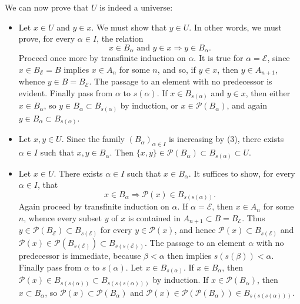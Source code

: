 \documentclass[11pt]{article}
\newcommand{\Pset}{\mathcal{P}}
\begin{document}
We can now prove that \(U\) is indeed a universe:
\begin{itemize}[leftmargin=4em]
\item[(U.I)] Let \(x\in U\) and \(y\in x\). We must show that \(y\in U\). In other words, we must prove, for every \(\alpha\in I\), the relation
\[
 x\in B_\alpha\text{ and }y\in x\Longrightarrow y\in B_\alpha.
\]
Proceed once more by transfinite induction on \(\alpha\). It is true for \(\alpha=\mathcal E\), since \(x\in B_{\mathcal E}=B\) implies \(x\in A_n\) for some \(n\), and so, if \(y\in x\), then \(y\in A_{n+1}\), whence \(y\in B=B_{\mathcal E}\). The passage to an element with no predecessor is evident. Finally pass from \(\alpha\) to \(s(\alpha)\). If \(x\in B_{s(\alpha)}\) and \(y\in x\), then either \(x\in B_\alpha\), so \(y\in B_\alpha\subset B_{s(\alpha)}\) by induction, or \(x\in\Pset(B_\alpha)\), and again \(y\in B_\alpha\subset B_{s(\alpha)}\).

\item[(U.II)] Let \(x,y\in U\). Since the family \((B_\alpha)_{\alpha\in I}\) is increasing by (3), there exists \(\alpha\in I\) such that \(x,y\in B_\alpha\). Then \(\{x,y\}\in\Pset(B_\alpha)\subset B_{s(\alpha)}\subset U\).

\item[(U.III)] Let \(x\in U\). There exists \(\alpha\in I\) such that \(x\in B_\alpha\). It suffices to show, for every \(\alpha\in I\), that
\[
 x\in B_\alpha\Longrightarrow \Pset(x)\in B_{s(s(\alpha))}.
\]
Again proceed by transfinite induction on \(\alpha\). If \(\alpha=\mathcal E\), then \(x\in A_n\) for some \(n\), whence every subset \(y\) of \(x\) is contained in \(A_{n+1}\subset B=B_{\mathcal E}\). Thus \(y\in\Pset(B_{\mathcal E})\subset B_{s(\mathcal E)}\) for every \(y\in\Pset(x)\), and hence \(\Pset(x)\subset B_{s(\mathcal E)}\) and \(\Pset(x)\in\Pset(B_{s(\mathcal E)})\subset B_{s(s(\mathcal E))}\). The passage to an element \(\alpha\) with no predecessor is immediate, because \(\beta<\alpha\) then implies \(s(s(\beta))<\alpha\). Finally pass from \(\alpha\) to \(s(\alpha)\). Let \(x\in B_{s(\alpha)}\). If \(x\in B_\alpha\), then \(\Pset(x)\in B_{s(s(\alpha))}\subset B_{s(s(s(\alpha)))}\) by induction. If \(x\in\Pset(B_\alpha)\), then \(x\subset B_\alpha\), so \(\Pset(x)\subset\Pset(B_\alpha)\) and \(\Pset(x)\in\Pset(\Pset(B_\alpha))\in B_{s(s(s(\alpha)))}\).


\end{itemize}
\end{document}
